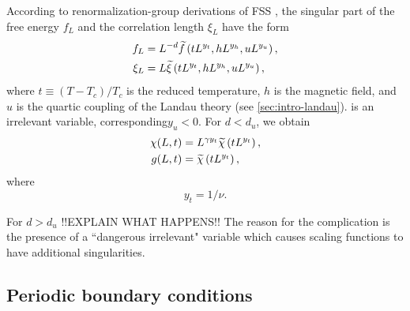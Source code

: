 According to renormalization-group derivations of FSS
\autocite{privman1983finite}, the singular part of the free energy $f_L$ and
the correlation length $\xi_L$ have the form
\begin{align}
  f_L &= L^{-d} \widetilde{f}\left(t L^{y_t}, h L^{y_h}, u L^{y_u}\right), \\
  \xi_L &= L \widetilde{\xi}\left(t L^{y_t}, h L^{y_h}, u L^{y_u}\right),
\end{align}
where $t\equiv(T-T_c)/T_c$ is the reduced temperature, $h$ is the magnetic
field, and $u$ is the quartic coupling of the Landau theory (see \cref{sec:intro-landau}).
is an irrelevant variable, corresponding$y_u<0$. For $d < d_u$, we obtain
\begin{subequations}
\begin{align}
  \chi(L,t) &= L^{\gamma y_t} \widetilde{\chi}\left(t L^{y_t}\right),
  \label{eq:fss-standard-susc} \\
  g(L,t) &= \widetilde{\chi}\left(t L^{y_t}\right),
\end{align}
\label{eq:fss-standard}
\end{subequations}
where
\begin{equation*}
  y_t = 1/\nu.
\end{equation*}

For $d > d_u$ !!EXPLAIN WHAT HAPPENS!!
The reason for the complication is the presence of a ``dangerous irrelevant"
variable which causes scaling functions to have additional singularities.


\subsection{Periodic boundary conditions}

